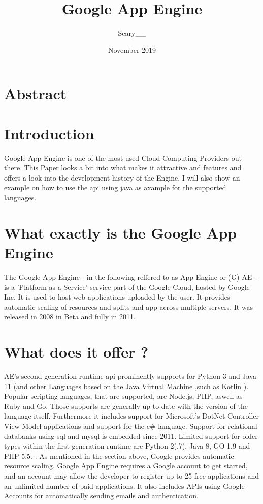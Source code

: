 \documentclass{article}
\title{Google App Engine}
\author{Scary\_\_}
\date{November 2019}
\begin{document}
\maketitle

\section{Abstract}

\section{Introduction}
Google App Engine is one of the most used Cloud Computing Providers out there. This Paper looks a bit into what makes it attractive and features and offers a look into the development history of the Engine. I will also show an example on how to use the api using java as axample for the supported languages.  

\section{What exactly is the Google App Engine}
The Google App Engine - in the following  reffered to as App Engine or (G) AE - is a 'Platform as a Service'-service part of the Google Cloud, hosted by Google Inc. It is used to host web applications uploaded by the user. It provides automatic scaling of resources and splits and app across multiple servers. It was released in 2008 in Beta and fully in 2011. 

\section{What does it offer ? }
AE's second generation runtime api prominently supports for Python 3 and Java 11 (and other Languages based on the Java Virtual Machine ,such as Kotlin ).
Popular scripting languages, that are supported, are Node.js, PHP, aswell as Ruby and Go.
Those supports are generally up-to-date with the version of the language itself. 
Furthermore it includes support for Microsoft's DotNet Controller View Model applications and support for the c\# language.
Support for relational databanks using sql and mysql is embedded since 2011. 
Limited support for older types within the first generation runtime are Python 2(.7), Java 8, GO 1.9 and PHP 5.5. .
As mentioned in the section above, Google provides automatic resource scaling.
Google App Engine requires a Google account to get started, and an account may allow the developer to register up to 25 free applications and an unlimited number of paid applications.
It also includes APIs using Google Accounts for automatically sending emails and authentication.
\end{document}
